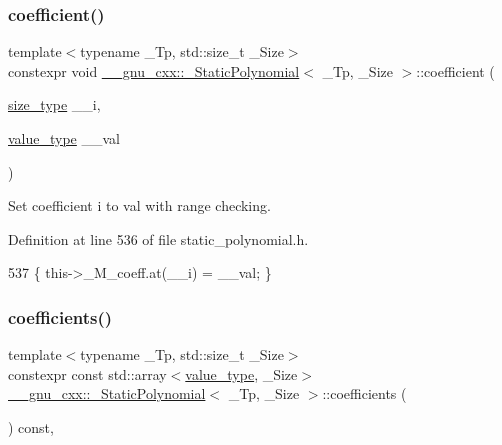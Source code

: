 \subsubsection{\texorpdfstring{coefficient()}{coefficient()}\hspace{0.1cm}{\footnotesize\ttfamily [2/2]}}
{\footnotesize\ttfamily template$<$typename \+\_\+\+Tp, std\+::size\+\_\+t \+\_\+\+Size$>$ \\
constexpr void \hyperlink{class____gnu__cxx_1_1__StaticPolynomial}{\+\_\+\+\_\+gnu\+\_\+cxx\+::\+\_\+\+Static\+Polynomial}$<$ \+\_\+\+Tp, \+\_\+\+Size $>$\+::coefficient (\begin{DoxyParamCaption}\item[{\hyperlink{class____gnu__cxx_1_1__StaticPolynomial_a0cc0aa4adab35686ef2474e07f511ff9}{size\+\_\+type}}]{\+\_\+\+\_\+i,  }\item[{\hyperlink{class____gnu__cxx_1_1__StaticPolynomial_aad5f3d6d5876b6926b30724aeac649d6}{value\+\_\+type}}]{\+\_\+\+\_\+val }\end{DoxyParamCaption})\hspace{0.3cm}{\ttfamily [inline]}}

Set coefficient {\ttfamily i} to {\ttfamily val} with range checking. 

Definition at line 536 of file static\+\_\+polynomial.\+h.


\begin{DoxyCode}
537       \{ this->\_M\_coeff.at(\_\_i) = \_\_val; \}
\end{DoxyCode}
\mbox{\label{class____gnu__cxx_1_1__StaticPolynomial_a185a60f11031e84b6986efda1c804fd8}} 
\subsubsection{\texorpdfstring{coefficients()}{coefficients()}\hspace{0.1cm}{\footnotesize\ttfamily [1/2]}}
{\footnotesize\ttfamily template$<$typename \+\_\+\+Tp, std\+::size\+\_\+t \+\_\+\+Size$>$ \\
constexpr const std\+::array$<$\hyperlink{class____gnu__cxx_1_1__StaticPolynomial_aad5f3d6d5876b6926b30724aeac649d6}{value\+\_\+type}, \+\_\+\+Size$>$ \hyperlink{class____gnu__cxx_1_1__StaticPolynomial}{\+\_\+\+\_\+gnu\+\_\+cxx\+::\+\_\+\+Static\+Polynomial}$<$ \+\_\+\+Tp, \+\_\+\+Size $>$\+::coefficients (\begin{DoxyParamCaption}{ }\end{DoxyParamCaption}) const\hspace{0.3cm}{\ttfamily [inline]}, {\ttfamily [noexcept]}}


